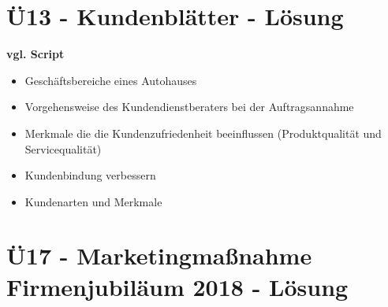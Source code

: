 \section{Ü13 - Kundenblätter - Lösung}\label{sec:U13-Kundenblaetter-test-Loesung}
%

\textbf{vgl. Script}

\begin{itemize}
    \item Geschäftsbereiche eines Autohauses
    \item Vorgehensweise des Kundendienstberaters bei der Auftragsannahme
    \item Merkmale die die Kundenzufriedenheit beeinflussen (Produktqualität und Servicequalität)
    \item Kundenbindung verbessern
    \item Kundenarten und Merkmale
\end{itemize}


\section{Ü17 - Marketingmaßnahme Firmenjubiläum 2018 - Lösung}
\newpage




